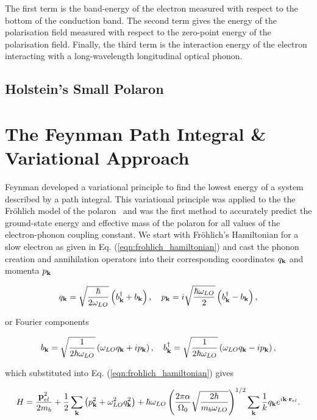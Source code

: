 The first term is the band-energy of the electron measured with respect to the bottom of the conduction band. The second term gives the energy of the polarisation field measured with respect to the zero-point energy of the polarisation field. Finally, the third term is the interaction energy of the electron interacting with a long-wavelength longitudinal optical phonon.

\subsection{Holstein's Small Polaron}
\label{subsec:2-1-3}

\section{The Feynman Path Integral \& Variational Approach}
\label{sec:2-2}

Feynman developed a variational principle to find the lowest energy of a system described by a path integral. This variational principle was applied to the the Fr\"ohlich model of the polaron~\cite{frohlich_electrons_1954} and was the first method to accurately predict the ground-state energy and effective mass of the polaron for all values of the electron-phonon coupling constant. We start with Fr\"ohlich's Hamiltonian for a slow electron as given in Eq. (\ref{eqn:frohlich_hamiltonian}) and cast the phonon creation and annihilation operators into their corresponding coordinates $q_{\vb{k}}$ and momenta $p_{\vb{k}}$

\begin{equation}
   q_{\vb{k}} = \sqrt{\frac{\hbar}{2\omega_{LO}}} \left(b^\dagger_{\vb{k}} + b_{\vb{k}} \right), \quad p_{\vb{k}} = i\sqrt{\frac{\hbar \omega_{LO}}{2}} \left(b^\dagger_{\vb{k}} - b_{\vb{k}} \right),
\end{equation}

or Fourier components

\begin{equation}
   b_{\vb{k}} = \sqrt{\frac{1}{2\hbar\omega_{LO}}} \left(\omega_{LO} q_{\vb{k}} + i p_{\vb{k}} \right), \quad b^\dagger_{\vb{k}} = \sqrt{\frac{1}{2\hbar\omega_{LO}}} \left(\omega_{LO} q_{\vb{k}} - i p_{\vb{k}} \right),
\end{equation}

which substituted into Eq. (\ref{eqn:frohlich_hamiltonian}) gives

\begin{equation}
    H = \frac{\vb{p}_{el}^2}{2m_b} + \frac{1}{2} \sum_{\vb{k}} \left( p_{\vb{k}}^2 + \omega_{LO}^2 q_{\vb{k}}^2 \right) + \hbar \omega_{LO} \left(\frac{2 \pi \alpha}{\Omega_0} \sqrt{\frac{2 \hbar}{m_b \omega_{LO}}}\right)^{1/2} \sum_{\vb{k}} \frac{1}{k} q_{\vb{k}} e^{i \vb{k} \cdot \vb{r}_{el}}.
\end{equation}


